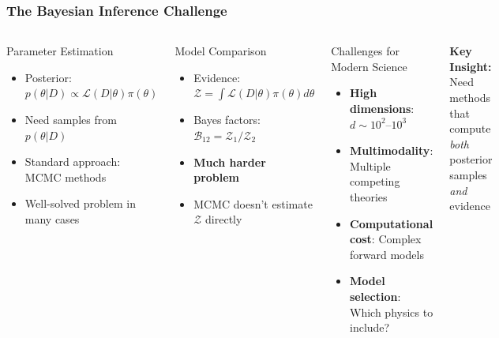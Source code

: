 \documentclass[aspectratio=169]{beamer}
\begin{document}
\begin{frame}
    \frametitle{The Bayesian Inference Challenge}
    \begin{columns}
        \begin{block}{Parameter Estimation}
            \begin{itemize}
                \item Posterior: $p(\theta|D) \propto \mathcal{L}(D|\theta) \pi(\theta)$
                \item Need samples from $p(\theta|D)$
                \item Standard approach: MCMC methods
                \item Well-solved problem in many cases
            \end{itemize}
        \end{block}
        \begin{block}{Model Comparison}
            \begin{itemize}
                \item Evidence: $\mathcal{Z} = \int \mathcal{L}(D|\theta) \pi(\theta) d\theta$
                \item Bayes factors: $\mathcal{B}_{12} = \mathcal{Z}_1 / \mathcal{Z}_2$
                \item \textbf{Much harder problem}
                \item MCMC doesn't estimate $\mathcal{Z}$ directly
            \end{itemize}
        \end{block}
        \begin{block}{Challenges for Modern Science}
            \begin{itemize}
                \item \textbf{High dimensions}: $d \sim 10^2$--$10^3$
                \item \textbf{Multimodality}: Multiple competing theories
                \item \textbf{Computational cost}: Complex forward models
                \item \textbf{Model selection}: Which physics to include?
            \end{itemize}
        \end{block}
        \vspace{10pt}
        \begin{center}
            \textbf{Key Insight:}\\
            Need methods that compute \emph{both} \\
            posterior samples \emph{and} evidence
        \end{center}
    \end{columns}
\end{frame}
\end{document}
